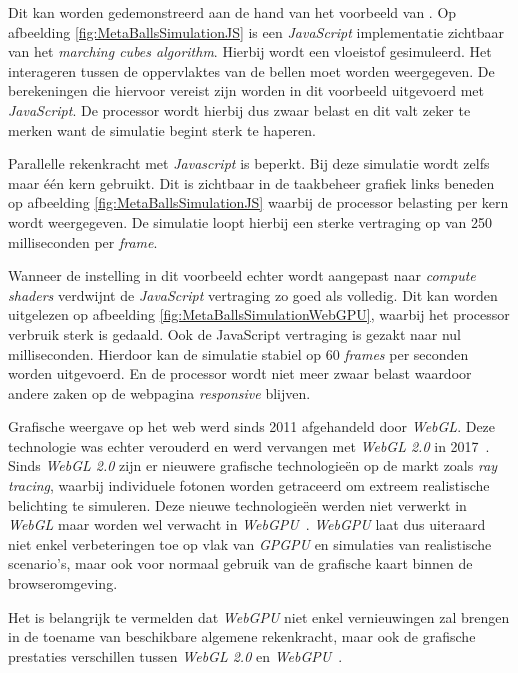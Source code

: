 \bigbreak{}

Dit kan worden gedemonstreerd aan de hand van het voorbeeld van \textcite{Jones2023}. Op afbeelding \ref{fig:MetaBallsSimulationJS} is een \textit{JavaScript} implementatie zichtbaar van het \textit{marching cubes algorithm}. Hierbij wordt een vloeistof gesimuleerd. Het interageren tussen de oppervlaktes van de bellen moet worden weergegeven. De berekeningen die hiervoor vereist zijn worden in dit voorbeeld uitgevoerd met \textit{JavaScript}. De processor wordt hierbij dus zwaar belast en dit valt zeker te merken want de simulatie begint sterk te haperen. 

\bigbreak{}

Parallelle rekenkracht met \textit{Javascript} is beperkt. Bij deze simulatie wordt zelfs maar één kern gebruikt. Dit is zichtbaar in de taakbeheer grafiek links beneden op afbeelding \ref{fig:MetaBallsSimulationJS} waarbij de processor belasting per kern wordt weergegeven. De simulatie loopt hierbij een sterke vertraging op van 250 milliseconden per \textit{frame}.

\bigbreak{}

Wanneer de instelling in dit voorbeeld echter wordt aangepast naar \textit{compute shaders} verdwijnt de \textit{JavaScript} vertraging zo goed als volledig. Dit kan worden uitgelezen op afbeelding \ref{fig:MetaBallsSimulationWebGPU}, waarbij het processor verbruik sterk is gedaald. Ook de JavaScript vertraging is gezakt naar nul milliseconden. Hierdoor kan de simulatie stabiel op 60 \textit{frames} per seconden worden uitgevoerd. En de processor wordt niet meer zwaar belast waardoor andere zaken op de webpagina \textit{responsive} blijven.

\bigbreak{}
Grafische weergave op het web werd sinds 2011 afgehandeld door \textit{WebGL}. Deze technologie was echter verouderd en werd vervangen met \textit{WebGL 2.0} in 2017~\autocite{Surma2022}. Sinds \textit{WebGL 2.0} zijn er nieuwere grafische technologieën op de markt zoals \textit{ray tracing}, waarbij individuele fotonen worden getraceerd om extreem realistische belichting te simuleren. Deze nieuwe technologieën werden niet verwerkt in \textit{WebGL} maar worden wel verwacht in \textit{WebGPU}~\autocite{Surma2022}. \textit{WebGPU} laat dus uiteraard niet enkel verbeteringen toe op vlak van \textit{GPGPU} en simulaties van realistische scenario's, maar ook voor normaal gebruik van de grafische kaart binnen de browseromgeving.

\bigbreak{}

Het is belangrijk te vermelden dat \textit{WebGPU} niet enkel vernieuwingen zal brengen in de toename van beschikbare algemene rekenkracht, maar ook de grafische prestaties verschillen tussen \textit{WebGL 2.0} en \textit{WebGPU}~\autocite{Wallez2023}. 